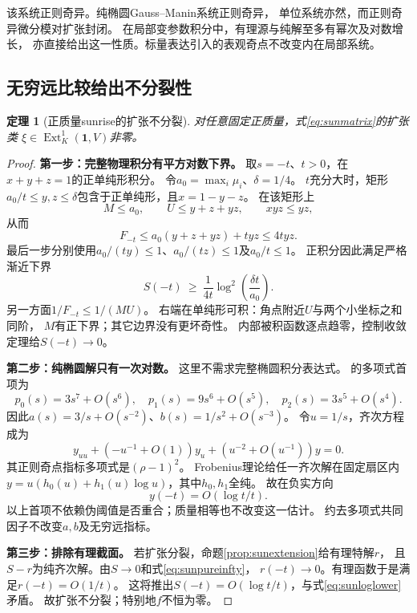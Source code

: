 \documentclass[11pt,a4paper]{ctexart}
\theoremstyle{cnplain}\newtheorem{theorem}{定理}[section]
\theoremstyle{definition}\newtheorem{definition}[theorem]{定义}
\theoremstyle{remark}\newtheorem{remark}[theorem]{注}
\begin{document}
该系统正则奇异。纯椭圆Gauss--Manin系统正则奇异，
单位系统亦然，而正则奇异微分模对扩张封闭。
在局部变参数积分中，有理源与纯解至多有幂次及对数增长，
亦直接给出这一性质。标量表达引入的表观奇点不改变内在局部系统。

\subsection{无穷远比较给出不分裂性}
\begin{theorem}[正质量sunrise的扩张不分裂]\label{thm:sunnonsplit}
对任意固定正质量，式\eqref{eq:sunmatrix}的扩张类
$\xi\in\operatorname{Ext}^1_K(\mathbf1,V)$非零。
\end{theorem}
\begin{proof}
\textbf{第一步：完整物理积分有平方对数下界。}
取$s=-t$、$t>0$，在$x+y+z=1$的正单纯形积分。
令$a_0=\max_i\mu_i$、$\delta=1/4$。
$t$充分大时，矩形
$a_0/t\le y,z\le\delta$包含于正单纯形，且$x=1-y-z$。
在该矩形上
\[
 M\le a_0,\qquad U\le y+z+yz,\qquad xyz\le yz ,
\]
从而
\[
 F_{-t}\le a_0(y+z+yz)+tyz\le4tyz.
\]
最后一步分别使用$a_0/(ty)\le1$、$a_0/(tz)\le1$及$a_0/t\le1$。
正积分因此满足严格渐近下界
\begin{equation}\label{eq:sunloglower}
 S(-t)\ \ge\ \frac1{4t}
       \log^2\!\left(\frac{\delta t}{a_0}\right).
\end{equation}
另一方面$1/F_{-t}\le1/(MU)$。
右端在单纯形可积：角点附近$U$与两个小坐标之和同阶，
$M$有正下界；其它边界没有更坏奇性。
内部被积函数逐点趋零，控制收敛定理给$S(-t)\to0$。

\textbf{第二步：纯椭圆解只有一次对数。}
这里不需求完整椭圆积分表达式。
\cite[式(38)--(39)]{ABWsun}的多项式首项为
\[
 p_0(s)=3s^7+O(s^6),\quad
 p_1(s)=9s^6+O(s^5),\quad
 p_2(s)=3s^5+O(s^4).
\]
因此$a(s)=3/s+O(s^{-2})$、$b(s)=1/s^2+O(s^{-3})$。
令$u=1/s$，齐次方程成为
\[
 y_{uu}+\left(-u^{-1}+O(1)\right)y_u
       +\left(u^{-2}+O(u^{-1})\right)y=0 .
\]
其正则奇点指标多项式是$(\rho-1)^2$。
Frobenius理论给任一齐次解在固定扇区内
$y=u(h_0(u)+h_1(u)\log u)$，其中$h_0,h_1$全纯。
故在负实方向
\begin{equation}\label{eq:sunpureinfty}
 y(-t)=O(\log t/t).
\end{equation}
以上首项不依赖伪阈值是否重合；质量相等也不改变这一估计。
约去多项式共同因子不改变$a,b$及无穷远指标。

\textbf{第三步：排除有理截面。}
若扩张分裂，命题\ref{prop:sunextension}给有理特解$r$，
且$S-r$为纯齐次解。由$S\to0$和式\eqref{eq:sunpureinfty}，
$r(-t)\to0$。有理函数于是满足$r(-t)=O(1/t)$。
这将推出$S(-t)=O(\log t/t)$，与式\eqref{eq:sunloglower}矛盾。
故扩张不分裂；特别地$f$不恒为零。
\end{proof}
\end{document}
